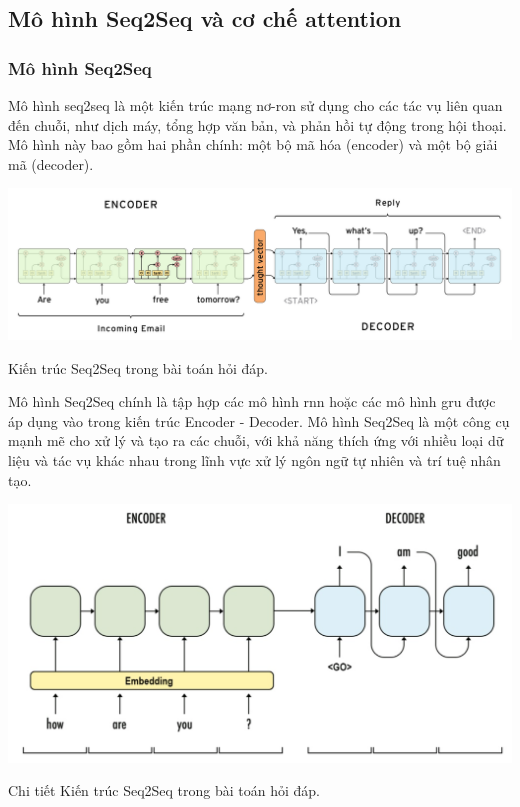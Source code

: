 \documentclass[a4paper, 12pt, openany]{book}
\begin{document}
\subsection{Mô hình Seq2Seq và cơ chế attention}
\subsubsection{Mô hình Seq2Seq}


Mô hình \ac{seq2seq} là một kiến trúc mạng nơ-ron sử dụng cho các tác vụ liên quan đến chuỗi, như dịch máy, tổng hợp văn bản, và phản hồi tự động trong hội thoại. Mô hình này bao gồm hai phần chính: một bộ mã hóa (encoder) và một bộ giải mã (decoder).

\begin{minipage}{\linewidth}
    \captionsetup{type=figure}
    \centering
    \includegraphics[width=\linewidth]{./assets/images/seq2seq.png}
    \caption{Kiến trúc Seq2Seq trong bài toán hỏi đáp.\cite{sutskever2014sequence}}
\end{minipage}

\vspace{0.5cm}

Mô hình Seq2Seq chính là tập hợp các mô hình \ac{rnn} hoặc các mô hình \ac{gru} được áp dụng vào trong kiến trúc Encoder - Decoder. Mô hình Seq2Seq 
là một công cụ mạnh mẽ cho xử lý và tạo ra các chuỗi, với khả năng thích ứng với nhiều loại dữ liệu và tác vụ khác nhau trong lĩnh vực xử lý ngôn ngữ tự nhiên và trí tuệ nhân tạo.

\begin{minipage}{\linewidth}
    \captionsetup{type=figure}
    \centering
    \includegraphics[width=\linewidth]{./assets/images/seq2seq2.png}
    \caption{Chi tiết Kiến trúc Seq2Seq trong bài toán hỏi đáp.\cite{sutskever2014sequence}}
\end{minipage}
\vspace{0.5cm}
\end{document}

